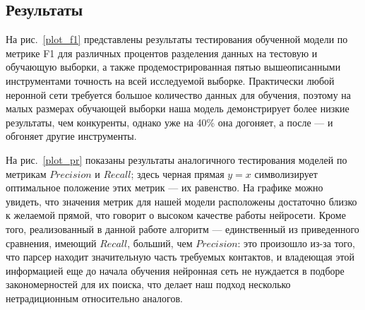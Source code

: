 \subsection{Результаты}
На рис.~\ref{plot_f1} представлены результаты тестирования обученной модели по метрике F1  для различных процентов разделения данных на тестовую и обучающую выборки, а также продемострированная пятью вышеописанными инструментами точность на всей исследуемой выборке. Практически любой неронной сети требуется большое количество данных для обучения, поэтому на малых размерах обучающей выборки наша модель демонстрирует более низкие результаты, чем конкуренты, однако уже на 40\% она догоняет, а после --- и обгоняет другие инструменты. 

На рис.~\ref{plot_pr} показаны результаты аналогичного тестирования моделей по метрикам $Precision$ и $Recall$; здесь черная прямая $y=x$ символизирует оптимальное положение этих метрик --- их равенство. На графике можно увидеть, что значения метрик для нашей модели расположены достаточно близко к желаемой прямой, что говорит о высоком качестве работы нейросети. Кроме того, реализованный в данной работе алгоритм --- единственный из приведенного сравнения, имеющий $Recall$, больший, чем $Precision$: это произошло из-за того, что парсер находит значительную часть требуемых контактов, и владеющая этой информацией еще до начала обучения нейронная сеть не нуждается в подборе закономерностей для их поиска, что делает наш подход несколько нетрадиционным относительно аналогов. 


